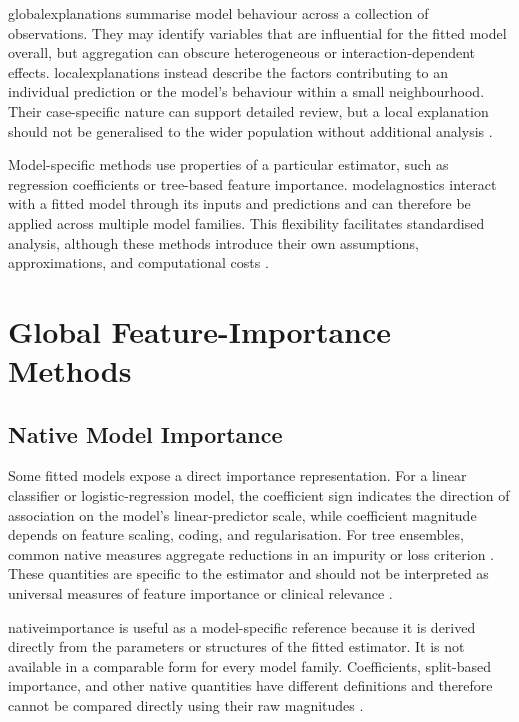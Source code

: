 \Glspl{globalexplanation} summarise model behaviour across a collection of observations. They may identify variables that are influential for the fitted model overall, but aggregation can obscure heterogeneous or interaction-dependent effects. \Glspl{localexplanation} instead describe the factors contributing to an individual prediction or the model's behaviour within a small neighbourhood. Their case-specific nature can support detailed review, but a local explanation should not be generalised to the wider population without additional analysis \citep{adadi_peeking_2018, barredo_arrieta_explainable_2020, linardatos_explainable_2020, ribeiro_why_2016}.

Model-specific methods use properties of a particular estimator, such as regression coefficients or tree-based feature importance. \Glspl{modelagnostic} interact with a fitted model through its inputs and predictions and can therefore be applied across multiple model families. This flexibility facilitates standardised analysis, although these methods introduce their own assumptions, approximations, and computational costs \citep{adadi_peeking_2018, barredo_arrieta_explainable_2020, linardatos_explainable_2020, vilone_classification_2021}.

\section{Global Feature-Importance Methods}

\subsection{Native Model Importance}

Some fitted models expose a direct importance representation. For a linear classifier or logistic-regression model, the coefficient sign indicates the direction of association on the model's linear-predictor scale, while coefficient magnitude depends on feature scaling, coding, and regularisation. For tree ensembles, common native measures aggregate reductions in an impurity or loss criterion \citep{breiman_random_2001}. These quantities are specific to the estimator and should not be interpreted as universal measures of feature importance or clinical relevance \citep{linardatos_explainable_2020, vilone_classification_2021}.

\Gls{nativeimportance} is useful as a model-specific reference because it is derived directly from the parameters or structures of the fitted estimator. It is not available in a comparable form for every model family. Coefficients, split-based importance, and other native quantities have different definitions and therefore cannot be compared directly using their raw magnitudes \citep{linardatos_explainable_2020, vilone_classification_2021, fisher_models_2019}.

